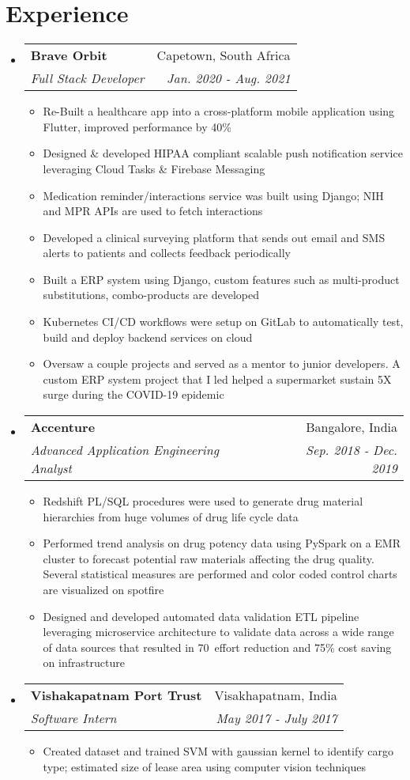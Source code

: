 \documentclass[letterpaper,10pt]{article}
\makeatletter
\newcommand{\resumeItemClean}[1]{
    \item\small{
        {#1 \vspace{-2pt}}
    }
}
\newcommand{\resumeSubheading}[4]{
  \vspace{-1pt}\item
    \begin{tabular*}{0.97\textwidth}[t]{l@{\extracolsep{\fill}}r}
      \textbf{#1} & #2 \\
      \textit{\small#3} & \textit{\small #4} \\
    \end{tabular*}\vspace{-5pt}
}
\newcommand{\resumeSubHeadingListStart}{\begin{itemize}[leftmargin=*]}
\newcommand{\resumeSubHeadingListEnd}{\end{itemize}}
\newcommand{\resumeItemListStart}{\begin{itemize}}
\newcommand{\resumeItemListEnd}{\end{itemize}\vspace{-5pt}}
\makeatother
\begin{document}
\section{Experience}
    \resumeSubHeadingListStart
    \resumeSubheading{Brave Orbit}{Capetown, South Africa}
        {Full Stack Developer}{Jan. 2020 - Aug. 2021}
            \resumeItemListStart
                \resumeItemClean
                    {Re-Built a healthcare app into a cross-platform mobile application using Flutter, improved performance by 40\%}
                  \resumeItemClean
                    {Designed \& developed HIPAA compliant scalable push notification service leveraging Cloud Tasks \& Firebase Messaging}
                  \resumeItemClean
                    {Medication reminder/interactions service was built using Django; NIH and MPR APIs are used to fetch interactions}
                  \resumeItemClean
                    {Developed a clinical surveying platform that sends out email and SMS alerts to patients and collects feedback periodically}
                  \resumeItemClean
                    {Built a ERP system using Django, custom features such as multi-product substitutions, combo-products are developed}
                  \resumeItemClean
                    {Kubernetes CI/CD workflows were setup on GitLab to automatically test, build and deploy backend services on cloud}
                  \resumeItemClean
                    {Oversaw a couple projects and served as a mentor to junior developers. A custom ERP system project that I led helped a supermarket sustain 5X surge during the COVID-19 epidemic}
                  
              \resumeItemListEnd
    \resumeSubheading
    	{Accenture}{Bangalore, India}
    	{Advanced Application Engineering Analyst}{Sep. 2018 -  Dec. 2019}
    	    \resumeItemListStart
                \resumeItemClean
                  {Redshift PL/SQL procedures were used to generate drug material hierarchies from huge volumes of drug life cycle data}
                \resumeItemClean
                  {Performed trend analysis on drug potency data using PySpark on a EMR cluster to forecast potential raw materials affecting the drug quality. Several statistical measures are performed and color coded control charts are visualized on spotfire}
                \resumeItemClean
                  {Designed and developed automated data validation ETL pipeline leveraging microservice architecture to validate data across a wide range of data sources that resulted in 70\
                  effort reduction and 75\% cost saving on infrastructure}
    	    \resumeItemListEnd
    \resumeSubheading
    	{Vishakapatnam Port Trust}{Visakhapatnam, India}
    	{Software Intern}{May 2017 -  July 2017}
    	    \resumeItemListStart
                \resumeItemClean
                  {Created dataset and trained SVM with gaussian kernel to identify cargo type; estimated size of lease area using computer vision techniques}
    	    \resumeItemListEnd
    \resumeSubHeadingListEnd
\end{document}
